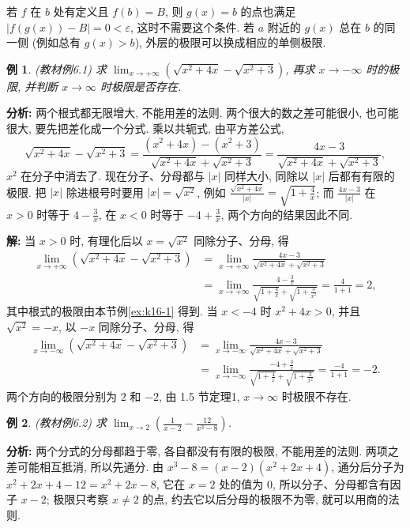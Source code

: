 \documentclass[UTF8,openany]{ctexbook}
\theoremstyle{chinesetextbook}
\newtheorem{example}{例}[section]
\newenvironment{cnsolution}{\par\indent\textbf{解:} \ignorespaces}{\par}
\begin{document}
若 $f$ 在 $b$ 处有定义且 $f(b)=B$, 则 $g(x)=b$ 的点也满足 $|f(g(x))-B|=0<\varepsilon$, 这时不需要这个条件. 若 $a$ 附近的 $g(x)$ 总在 $b$ 的同一侧 (例如总有 $g(x)>b$), 外层的极限可以换成相应的单侧极限.
\begin{example}
\textnormal{(教材例6.1)} 求 $\displaystyle\lim_{x\to+\infty}\left(\sqrt{x^2+4x}-\sqrt{x^2+3}\right)$, 再求 $x\to-\infty$ 时的极限, 并判断 $x\to\infty$ 时极限是否存在.
\end{example}
\par\indent\textbf{分析:} 两个根式都无限增大, 不能用差的法则. 两个很大的数之差可能很小, 也可能很大, 要先把差化成一个分式. 乘以共轭式, 由平方差公式,
\[
\sqrt{x^2+4x}-\sqrt{x^2+3}=\frac{(x^2+4x)-(x^2+3)}{\sqrt{x^2+4x}+\sqrt{x^2+3}}=\frac{4x-3}{\sqrt{x^2+4x}+\sqrt{x^2+3}},
\]
$x^2$ 在分子中消去了. 现在分子、分母都与 $|x|$ 同样大小, 同除以 $|x|$ 后都有有限的极限. 把 $|x|$ 除进根号时要用 $|x|=\sqrt{x^2}$, 例如 $\displaystyle\frac{\sqrt{x^2+4x}}{|x|}=\sqrt{1+\frac4x}$; 而 $\displaystyle\frac{4x-3}{|x|}$ 在 $x>0$ 时等于 $\displaystyle4-\frac3x$, 在 $x<0$ 时等于 $\displaystyle-4+\frac3x$, 两个方向的结果因此不同.
\begin{cnsolution}
当 $x>0$ 时, 有理化后以 $x=\sqrt{x^2}$ 同除分子、分母, 得
\[
\begin{aligned}
\lim_{x\to+\infty}\left(\sqrt{x^2+4x}-\sqrt{x^2+3}\right)
&=\lim_{x\to+\infty}\frac{4x-3}{\sqrt{x^2+4x}+\sqrt{x^2+3}}\\
&=\lim_{x\to+\infty}\frac{4-\frac3x}{\sqrt{1+\frac4x}+\sqrt{1+\frac3{x^2}}}=\frac4{1+1}=2,
\end{aligned}
\]
其中根式的极限由本节例\ref{ex:k16-1} 得到. 当 $x<-4$ 时 $x^2+4x>0$, 并且 $\sqrt{x^2}=-x$, 以 $-x$ 同除分子、分母, 得
\[
\begin{aligned}
\lim_{x\to-\infty}\left(\sqrt{x^2+4x}-\sqrt{x^2+3}\right)
&=\lim_{x\to-\infty}\frac{4x-3}{\sqrt{x^2+4x}+\sqrt{x^2+3}}\\
&=\lim_{x\to-\infty}\frac{-4+\frac3x}{\sqrt{1+\frac4x}+\sqrt{1+\frac3{x^2}}}=\frac{-4}{1+1}=-2.
\end{aligned}
\]
两个方向的极限分别为 $2$ 和 $-2$, 由 1.5 节定理1, $x\to\infty$ 时极限不存在.
\end{cnsolution}
\begin{example}\label{ex:6-2}
\textnormal{(教材例6.2)} 求 $\displaystyle\lim_{x\to2}\left(\frac1{x-2}-\frac{12}{x^3-8}\right)$.
\end{example}
\par\indent\textbf{分析:} 两个分式的分母都趋于零, 各自都没有有限的极限, 不能用差的法则. 两项之差可能相互抵消, 所以先通分. 由 $x^3-8=(x-2)(x^2+2x+4)$, 通分后分子为 $x^2+2x+4-12=x^2+2x-8$, 它在 $x=2$ 处的值为 $0$, 所以分子、分母都含有因子 $x-2$; 极限只考察 $x\ne2$ 的点, 约去它以后分母的极限不为零, 就可以用商的法则.
\end{document}
